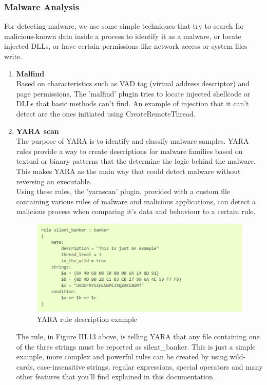 \subsubsection{Malware Analysis}
For detecting malware, we use some simple techniques that try to search for malicious-known data inside a process to identify it as a malware, or locate injected DLLs, or have certain permissions like network access or system files write.
\begin{enumerate}[label=(\alph*)]
    \item \textbf{Malfind}\\
     Based on characteristics such as VAD tag (virtual address descriptor) and page permissions, The 'malfind' plugin tries to locate injected shellcode or DLLs that basic methods can't find. An example of injection that it can't detect are the ones initiated using CreateRemoteThread.
    \item \textbf{YARA scan}\\
     The purpose of YARA is to identify and classify malware samples. YARA rules provide a way to create descriptions for malware families based on textual or binary patterns that the determine the logic behind the malware. This makes YARA as the main way that could detect malware without reversing an executable.\\
     Using these rules, the 'yarascan' plugin, provided with a custom file containing various rules of malware and malicious applications, can detect a malicious process when comparing it's data and behaviour to a certain rule.
     \begin{figure}[H]
     \centering
     \includegraphics[width=0.8\columnwidth]{Figures/yara.png}
     \caption{YARA rule description example}
     \end{figure}
     The rule, in Figure III.13 above, is telling YARA that any file containing one of the three strings must be reported as silent\_banker. This is just a simple example, more complex and powerful rules can be created by using wild-cards, case-insensitive strings, regular expressions, special operators and many other features that you’ll find explained in this documentation\cite{yara_doc}.
\end{enumerate}


